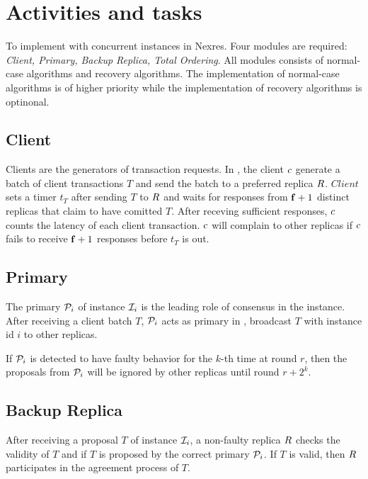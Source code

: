 \section{Activities and tasks}

\par To implement \RCC{} with concurrent \PBFT{} instances in Nexres. Four modules are required: \emph{Client, 
Primary, Backup Replica, Total Ordering}. All modules consists of normal-case algorithms and recovery algorithms. 
The implementation of normal-case algorithms is of higher priority while the implementation of recovery algorithms 
is optinonal.

\subsection{Client}

\par Clients are the generators of transaction requests. In \RCC{}, the client $\Client{}$ generate a batch 
of client transactions $T$ and send the batch to a preferred replica $\Replica{}$. $Client{}$ sets a timer 
$t_T$ after sending $T$ to $\Replica{}$ and waits for responses from $\mathbf{f}+1$ distinct replicas that claim 
to have comitted $T$. After receving sufficient responses, $\Client{}$ counts the latency of each client 
transaction. $\Client{}$ will complain to other replicas if $\Client{}$ fails to receive $\mathbf{f}+1$ responses 
before $t_T$ is out.

\subsection{Primary}

\par The primary $\mathcal{P}_{i}$ of instance $\mathcal{I}_{i}$ is the leading role of consensus in the 
instance. After receiving a client batch $T$, $\mathcal{P}_{i}$ acts as primary in \PBFT{}, broadcast $T$ 
with instance id $i$ to other replicas.

\par If $\mathcal{P}_{i}$ is detected to have faulty behavior for the $k$-th time at round $r$, then the proposals 
from $\mathcal{P}_{i}$ will be ignored by other replicas until round $r + 2^k$.

\subsection{Backup Replica}

\par After receiving a proposal $T$ of instance $\mathcal{I}_{i}$, a non-faulty replica $\Replica{}$ 
checks the validity of $T$ and if $T$ is proposed by the correct primary $\mathcal{P}_{i}$. If $T$ is valid, 
then $\Replica{}$ participates in the \PBFT{} agreement process of $T$.

